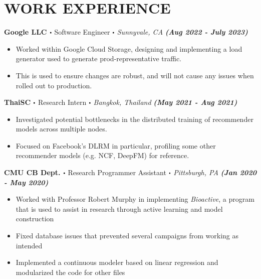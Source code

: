 \documentclass[10pt]{article}
\newcommand\sbullet[1][.5]{\mathbin{\vcenter{\hbox{\scalebox{#1}{$\bullet$}}}}}
\begin{document}
  \section*{\large \textcolor{lighterB} {WORK EXPERIENCE}}
  \vspace*{-0.23cm}

\textbf{\large Google LLC $\sbullet$} {\large Software Engineer $\sbullet$ \textit{Sunnyvale, CA}} {\hfill \textit{\textbf{(Aug 2022 - July 2023)}}}

  \vspace*{-0.2cm}
  \begin{itemize}
    \itemsep-0.4em
\item \textcolor{lighterG}{Worked within Google Cloud Storage, designing and implementing a load generator used to generate prod-representative traffic.}
    \item \textcolor{lighterG}{This is used to ensure changes are robust, and will not cause any issues when rolled out to production.}
  \end{itemize}

\textbf{\large ThaiSC $\sbullet$} {\large Research Intern $\sbullet$ \textit{Bangkok, Thailand}} {\hfill \textit{\textbf{(May 2021 - Aug 2021)}}}

  \vspace*{-0.2cm}
  \begin{itemize}
    \itemsep-0.4em
    \item \textcolor{lighterG}{Investigated potential bottlenecks in the distributed training of recommender models across multiple nodes.}
    \item \textcolor{lighterG}{Focused on Facebook's DLRM in particular, profiling some other recommender models (e.g. NCF, DeepFM) for reference.}
  \end{itemize}

\textbf{\large CMU CB Dept. $\sbullet$} {\large Research Programmer Assistant $\sbullet$ \textit{Pittsburgh, PA}} {\hfill \textit{\textbf{(Jan 2020 - May 2020)}}}

  \vspace*{-0.2cm}
  \begin{itemize}
    \itemsep-0.4em
    \item \textcolor{lighterG}{Worked with Professor Robert Murphy in implementing \textit{Bioactive}, a program that is used to assist in research through active learning and model construction}
    \item \textcolor{lighterG}{Fixed database issues that prevented several campaigns from working as intended}
    \item \textcolor{lighterG}{Implemented a continuous modeler based on linear regression and modularized the code for other files}
  \end{itemize}
\end{document}
